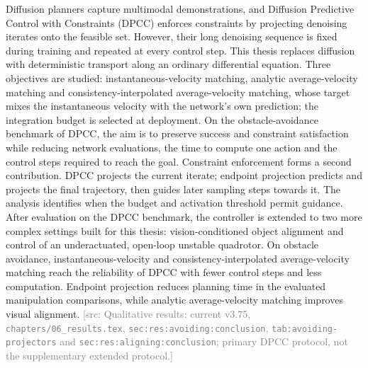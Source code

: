 \documentclass[headsepline,footsepline,footinclude=false,oneside,fontsize=11pt,paper=a4,listof=totoc,bibliography=totoc]{scrbook}
\theoremstyle{definition}
\theoremstyle{plain}
\theoremstyle{remark}
\newif\ifsubmission
\newcommand{\srcnote}[1]{\ifsubmission\else\textcolor{gray}{\footnotesize\textsf{[src: #1]}}\fi}
\begin{document}
\ifstandalone
Diffusion planners capture multimodal demonstrations, and Diffusion Predictive Control with
Constraints (DPCC) enforces constraints by projecting denoising iterates onto the feasible set.
However, their long denoising sequence is fixed during training and repeated at every control step.
This thesis replaces diffusion with deterministic transport along an ordinary differential equation.
Three objectives are studied: instantaneous-velocity matching, analytic average-velocity matching and
consistency-interpolated average-velocity matching, whose target mixes the instantaneous velocity with
the network's own prediction; the integration budget is selected at deployment. On the
obstacle-avoidance benchmark of DPCC, the aim is to preserve success and
constraint satisfaction while reducing network evaluations, the time to compute one action and the
control steps required to reach the goal. Constraint enforcement forms a second contribution. DPCC projects the
current iterate; endpoint projection predicts and projects the final trajectory,
then guides later sampling steps towards it. The analysis identifies when the budget and activation threshold permit guidance. After evaluation on the DPCC benchmark, the controller is extended to two
more complex settings built for this thesis: vision-conditioned object alignment and control of an
underactuated, open-loop unstable quadrotor. On obstacle avoidance, instantaneous-velocity and
consistency-interpolated average-velocity matching reach the reliability of DPCC with fewer control
steps and less computation. Endpoint projection reduces planning time in the evaluated manipulation
comparisons, while analytic average-velocity matching improves visual alignment.
\fi
\srcnote{Qualitative results: current v3.75, \texttt{chapters/06\_results.tex},
\texttt{sec:res:avoiding:conclusion}, \texttt{tab:avoiding-projectors} and
\texttt{sec:res:aligning:conclusion}; primary DPCC protocol, not the supplementary extended protocol.}

\tableofcontents{}

\mainmatter{}
\end{document}
